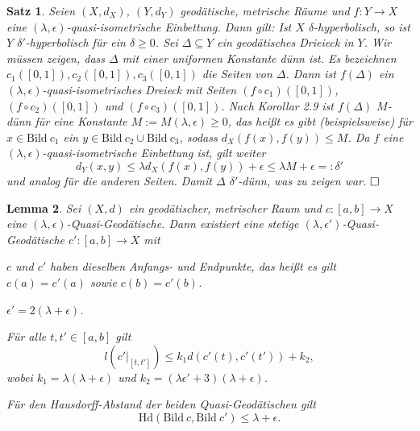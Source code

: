\documentclass[11pt]{book}
\numberwithin{dummy}{section}
\newtheorem{theorem}{Satz}[section]
\newtheorem{lemma}[theorem]{Lemma}
\theoremstyle{nonumberbreak}
\newenvironment{pr}[1][]{\ifthenelse{\equal{#1}{}}{\proof}{\proof[#1]}\rm}{\endproof}
\newcommand{\la}{\longrightarrow}
\begin{document}
\begin{spacing}{1.4}
\begin{theorem}     %
Seien $(X,d_X)$, $(Y,d_Y)$ geodätische, metrische Räume und $f: Y\la X$ eine $(\lambda, \epsilon)$-quasi-isometrische Einbettung. Dann gilt: Ist $X$ $\delta$-hyperbolisch, so ist $Y$  $\delta'$-hyperbolisch für ein $\delta \geqslant 0$.
\begin{pr}
Sei $\Delta \subseteq Y$ ein geodätisches Drieieck in $Y$. Wir müssen zeigen, dass $\Delta$ mit einer uniformen Konstante dünn ist. Es bezeichnen $c_1([0,1]), c_2([0,1]), c_3([0,1])$ die Seiten von $\Delta$. Dann ist $f(\Delta)$ ein $(\lambda, \epsilon)$-quasi-isometrisches Dreieck mit Seiten $(f\circ c_1)([0,1])$, $(f\circ c_2)([0,1])$ und $(f \circ c_3)([0,1])$. Nach Korollar 2.9 ist $f(\Delta)$ $M$-dünn für eine Konstante $M:= M(\lambda, \epsilon) \geqslant 0$, das heißt es gibt (beispielsweise) für $x \in \mathrm{Bild} \ c_1$ ein $y \in \mathrm{Bild} \ c_2 \cup \mathrm{Bild} \ c_3$, sodass $d_X(f(x), f(y)) \leqslant M$. Da $f$ eine $(\lambda, \epsilon)$-quasi-isometrische Einbettung ist, gilt weiter
$$d_Y(x,y) \leqslant \lambda d_X(f(x), f(y)) + \epsilon \leqslant \lambda M + \epsilon  =: \delta'$$
und analog für die anderen Seiten. Damit $\Delta$ $\delta'$-dünn, was zu zeigen war. $\hfill \Box$



\end{pr}

\end{theorem}


\begin{lemma}   %
Sei $(X,d)$ ein geodätischer, metrischer Raum und $c:[a,b] \la X$ eine $(\lambda, \epsilon)$-Quasi-Geodätische. Dann existiert eine stetige $(\lambda, \epsilon')$-Quasi-Geodätische $c':[a,b] \la X$ mit
\begin{compactenum}
\item $c$ und $c'$ haben dieselben Anfangs- und Endpunkte, das heißt es gilt $c(a)=c'(a)$ sowie $c(b)=c'(b)$.
\item $\epsilon'=2(\lambda+\epsilon)$.
\item Für alle $t,t' \in [a,b]$ gilt 
$$l\left( c'\vert_{[t,t']}\right) \leqslant k_1  d\left( c'(t), c'(t')\right) + k_2,$$
wobei $k_1=\lambda(\lambda + \epsilon)$ und $k_2= (\lambda \epsilon' + 3)(\lambda + \epsilon)$.
\item Für den Hausdorff-Abstand der beiden Quasi-Geodätischen gilt 
$$\mathrm{Hd}\left( \mathrm{Bild} \ c, \mathrm{Bild} \ c'\right) \leqslant \lambda + \epsilon.$$
\end{compactenum}



\end{lemma}
\end{spacing}
\end{document}
